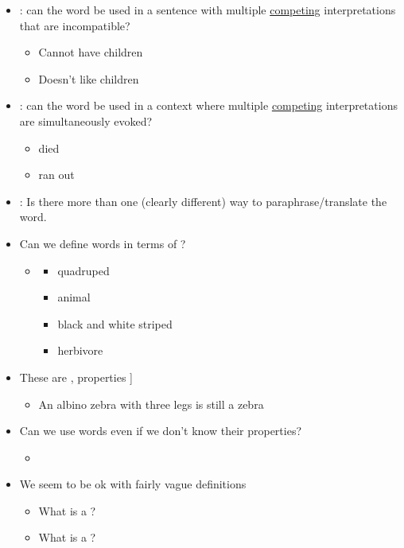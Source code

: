 \documentclass[a4paper,landscape,headrule,footrule,xetex]{foils}
\begin{document}
\begin{itemize}
\item {}: can the word be used in a sentence with
  multiple \underline{competing} interpretations that are incompatible? \\[1ex]
  \begin{itemize}
  \item Cannot have children
  \item Doesn't like children
  \end{itemize}
\item {}: can the word be used in a context where multiple
  \underline{competing} interpretations are simultaneously evoked? \\[1ex]
    \begin{itemize}
    \item died
    \item ran out
    \end{itemize}
  \task
  \item  {}: Is there more than one (clearly different) way to paraphrase/translate the word.
  \end{itemize}


\begin{itemize}
\item Can we define words in terms of ?
  \begin{itemize}
  \item {}
    \begin{itemize}
    \item quadruped
    \item animal 
    \item black and white striped
    \item herbivore
    \end{itemize}
  \end{itemize}
\item These are ,  properties
  ]
  \begin{itemize}
  \item An albino zebra with three legs is still a zebra
  \end{itemize}
\item Can we use words even if we don't know their properties?
  \begin{itemize}
  \item {}
  \end{itemize}
\item We seem to be ok with fairly vague definitions
  \begin{itemize}
  \item What is a ? \task
  \item What is a ? \task
  \end{itemize}
\end{itemize}
\end{document}
